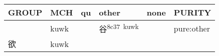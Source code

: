 \documentclass[14pt,a4paper]{scrartcl}
\begin{document}
\begin{longtable}[c]{@{}llllll@{}}
\toprule
\begin{minipage}[b]{0.14\columnwidth}\raggedright\strut
GROUP
\strut\end{minipage} &
\begin{minipage}[b]{0.14\columnwidth}\raggedright\strut
MCH
\strut\end{minipage} &
\begin{minipage}[b]{0.14\columnwidth}\raggedright\strut
qu
\strut\end{minipage} &
\begin{minipage}[b]{0.14\columnwidth}\raggedright\strut
other
\strut\end{minipage} &
\begin{minipage}[b]{0.14\columnwidth}\raggedright\strut
none
\strut\end{minipage} &
\begin{minipage}[b]{0.14\columnwidth}\raggedright\strut
PURITY
\strut\end{minipage}\tabularnewline
\midrule
\endhead
\begin{minipage}[t]{0.14\columnwidth}\raggedright\strut
𠔌
\strut\end{minipage} &
\begin{minipage}[t]{0.14\columnwidth}\raggedright\strut
kuwk
\strut\end{minipage} &
\begin{minipage}[t]{0.14\columnwidth}\raggedright\strut
\strut\end{minipage} &
\begin{minipage}[t]{0.14\columnwidth}\raggedright\strut
谷\textsuperscript{8c37~kuwk}
\strut\end{minipage} &
\begin{minipage}[t]{0.14\columnwidth}\raggedright\strut
\strut\end{minipage} &
\begin{minipage}[t]{0.14\columnwidth}\raggedright\strut
pure:other
\strut\end{minipage}\tabularnewline
\begin{minipage}[t]{0.14\columnwidth}\raggedright\strut
欲
\strut\end{minipage} &
\begin{minipage}[t]{0.14\columnwidth}\raggedright\strut
kuwk
\strut\end{minipage} &
\begin{minipage}[t]{0.14\columnwidth}\raggedright\strut
\strut\end{minipage} &

\end{longtable}
\end{document}
